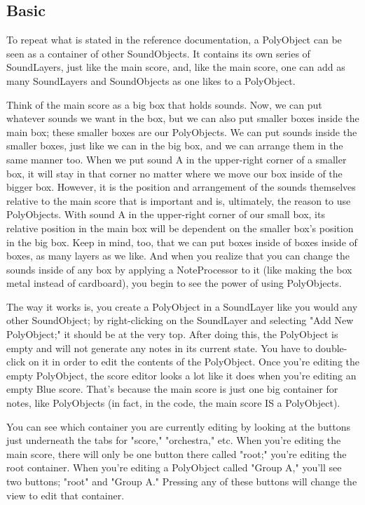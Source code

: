 \subsection{Basic}

To repeat what is stated in the reference documentation, a PolyObject
can be seen as a container of other SoundObjects. It contains its own
series of SoundLayers, just like the main score, and, like the main
score, one can add as many SoundLayers and SoundObjects as one likes to
a PolyObject.

Think of the main score as a big box that holds sounds. Now, we can put
whatever sounds we want in the box, but we can also put smaller boxes
inside the main box; these smaller boxes are our PolyObjects. We can put
sounds inside the smaller boxes, just like we can in the big box, and we
can arrange them in the same manner too. When we put sound A in the
upper-right corner of a smaller box, it will stay in that corner no
matter where we move our box inside of the bigger box. However, it is
the position and arrangement of the sounds themselves relative to the
main score that is important and is, ultimately, the reason to use
PolyObjects. With sound A in the upper-right corner of our small box,
its relative position in the main box will be dependent on the smaller
box's position in the big box. Keep in mind, too, that we can put boxes
inside of boxes inside of boxes, as many layers as we like. And when you
realize that you can change the sounds inside of any box by applying a
NoteProcessor to it (like making the box metal instead of cardboard),
you begin to see the power of using PolyObjects.

The way it works is, you create a PolyObject in a SoundLayer like you
would any other SoundObject; by right-clicking on the SoundLayer and
selecting "Add New PolyObject;" it should be at the very top. After
doing this, the PolyObject is empty and will not generate any notes in
its current state. You have to double-click on it in order to edit the
contents of the PolyObject. Once you're editing the empty PolyObject,
the score editor looks a lot like it does when you're editing an empty
Blue score. That's because the main score is just one big container for
notes, like PolyObjects (in fact, in the code, the main score IS a
PolyObject).

You can see which container you are currently editing by looking at the
buttons just underneath the tabs for "score," "orchestra," etc. When
you're editing the main score, there will only be one button there
called "root;" you're editing the root container. When you're editing a
PolyObject called "Group A," you'll see two buttons; "root" and "Group
A." Pressing any of these buttons will change the view to edit that
container.

